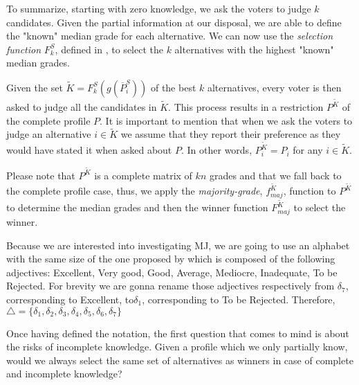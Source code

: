 \documentclass[version=3.21, pagesize, twoside=off, bibliography=totoc, DIV=calc, fontsize=12pt, a4paper]{scrartcl}
\begin{document}
To summarize, starting with zero knowledge, we ask the voters to judge $k$ candidates. Given the partial information at our disposal, we are able to define the "known" median grade for each alternative. We can now use the \emph{selection function} $F^S_k$, defined in , to select the $k$ alternatives with the highest "known" median grades.

Given the set $\tilde{K}=F^S_k(g(\overline{P}^S_i))$ of the best $k$ alternatives, every voter is then asked to judge all the candidates in $\tilde{K}$. 
This process results in a restriction $P^{\tilde{K}}$ of the complete profile $P$. It is important to mention that when we ask the voters to judge an alternative $i\in \tilde{K}$ we assume that they report their preference as they would have stated it when asked about $P$. In other words, $P^{\tilde{K}}_{i} = P_i$ for any $i \in \tilde{K}$.

Please note that $P^{\tilde{K}}$ is a complete matrix of $kn$ grades and that we fall back to the complete profile case, thus, we apply the \emph{majority-grade}, $f^{\tilde{K}}_{maj}$, function to $P^{\tilde{K}}$ to determine the median grades and then the winner function $F^{\tilde{K}}_{maj}$ to select the winner. 

\begin{remark}
	Because we are interested into investigating \acs{MJ}, we are going to use an alphabet with the same size of the one proposed by \citet{Balinski2011} which is composed of the following adjectives: Excellent, Very good, Good, Average, Mediocre, Inadequate, To be Rejected. For brevity we are gonna rename those adjectives respectively from $\delta_7$, corresponding to Excellent, to$\delta_1$, corresponding to To be Rejected. Therefore, $\triangle=\{\delta_1,\delta_2, \delta_3,\delta_4,\delta_5,\delta_6,\delta_7\}$ 
\end{remark}

Once having defined the notation, the first question that comes to mind is about the risks of incomplete knowledge. Given a profile which we only partially know, would we always select the same set of alternatives as winners in case of complete and incomplete knowledge?
\end{document}
